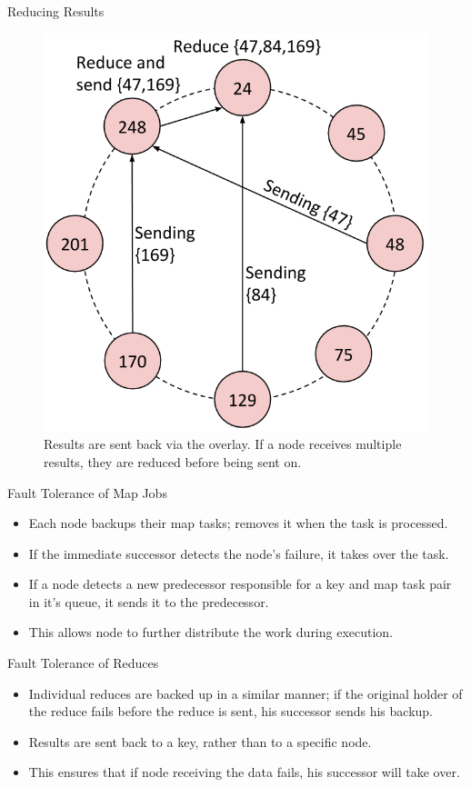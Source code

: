 \documentclass[11pt]{beamer}
\begin{document}
\begin{frame}{Reducing Results}
\begin{figure}
    \includegraphics[width=0.50\linewidth]{CR_dataflow3}
    \caption{Results are sent back via the overlay. If a node receives multiple results, they are reduced before being sent on.}
\end{figure}
\end{frame}



\begin{frame}{Fault Tolerance of Map Jobs}
\begin{itemize}
	\item Each node backups their map tasks; removes it when the task is processed.
	\item If the immediate successor detects the node's failure, it takes over the task.
	\item If a node detects a new predecessor responsible for a key and map task pair in it's queue, it sends it to the predecessor.
	\item This allows node to further distribute the work during execution.
\end{itemize}
\end{frame}



\begin{frame}{Fault Tolerance of Reduces}
\begin{itemize}
	\item Individual reduces are backed up in a similar manner; if the original holder of the reduce fails before the reduce is sent, his successor sends his backup.
	\item Results are sent back to a key, rather than to a specific node.
	\item This ensures that if node receiving the data fails, his successor will take over.
\end{itemize}
\end{frame}
\end{document}
